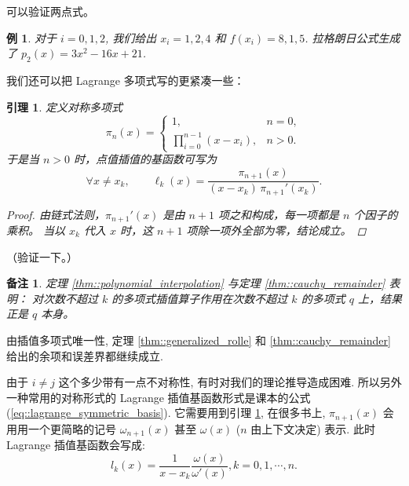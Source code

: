 \documentclass[a4paper]{ctexart}
\newtheorem{remark}{备注}
\newtheorem{lemma}[theorem]{引理}
\newtheorem{example}[theorem]{例}
\numberwithin{theorem}{section}
\numberwithin{equation}{section}
\numberwithin{figure}{section}
\numberwithin{remark}{section}
\begin{document}
可以验证两点式。

\begin{example}
    \label{exp::lagrange}
对于 $i = 0, 1, 2$, 我们给出 $x_i = 1, 2, 4$ 和 $f (x_i ) = 8, 1, 5$. 
拉格朗日公式生成了 $p_2 (x) = 3x^2 - 16x + 21$.
    
\end{example}

我们还可以把 Lagrange 多项式写的更紧凑一些：

\begin{lemma}
    \label{lem::lagrange_symmetric}
定义对称多项式
\begin{equation}
    \label{eq::lagrange_symmetric}
\pi_n(x)=
\begin{cases}
1, & n=0,\\[4pt]
\displaystyle\prod_{i=0}^{n-1}(x-x_i), & n>0.
\end{cases}
\end{equation}
于是当 $n>0$ 时，点值插值的基函数可写为
\begin{equation}
    \label{eq::lagrange_symmetric_basis}
\forall x\ne x_k,\qquad
\ell_k(x)=\frac{\pi_{n+1}(x)}{(x-x_k)\,\pi_{n+1}'(x_k)}.
\end{equation}

\begin{proof}
由链式法则，$\pi_{n+1}'(x)$ 是由 $n+1$ 项之和构成，每一项都是 $n$ 个因子的乘积。
当以 $x_k$ 代入 $x$ 时，这 $n+1$ 项除一项外全部为零，结论成立。
\end{proof}
\end{lemma}
（验证一下。）

\begin{remark}
定理 \ref{thm::polynomial_interpolation} 与定理 \ref{thm::cauchy_remainder} 表明：
对次数不超过 $k$ 的多项式插值算子作用在次数不超过 $k$ 的多项式 $q$ 上，结果正是 $q$ 本身。    
\end{remark}

由插值多项式唯一性, 定理 \ref{thm::generalized_rolle} 
和 \ref{thm::cauchy_remainder} 给出的余项和误差界都继续成立.

由于 $i \neq j$ 这个多少带有一点不对称性, 有时对我们的理论推导造成困难.
所以另外一种常用的对称形式的 Lagrange 插值基函数形式是课本的公式 (\ref{eq::lagrange_symmetric_basis}).
它需要用到引理 \ref{lem::lagrange_symmetric}, 在很多书上, $\pi_{n + 1}(x)$ 会用用一个更简略的记号
$\omega_{n + 1}(x)$ 甚至 $\omega(x)$ ($n$ 由上下文决定) 表示. 此时
Lagrange 插值基函数会写成:
$$
l_k(x) = \frac{1}{x - x_k}\frac{\omega(x)}{\omega'(x)}, k = 0, 1, \cdots, n.
$$
\end{document}

